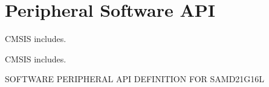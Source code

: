 \hypertarget{group___s_a_m_d21_g16_l__api}{}\section{Peripheral Software A\+PI}
\label{group___s_a_m_d21_g16_l__api}


C\+M\+S\+IS includes.  


C\+M\+S\+IS includes. 

S\+O\+F\+T\+W\+A\+RE P\+E\+R\+I\+P\+H\+E\+R\+AL A\+PI D\+E\+F\+I\+N\+I\+T\+I\+ON F\+OR S\+A\+M\+D21\+G16L 